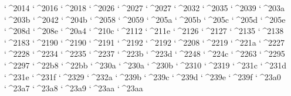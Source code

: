 \XeTeXcharclass `^^^^2014 \symbols
\XeTeXcharclass `^^^^2016 \symbols
\XeTeXcharclass `^^^^2018 \symbols
\XeTeXcharclass `^^^^2026 \symbols
\XeTeXcharclass `^^^^2027 \symbols
\XeTeXcharclass `^^^^2027 \symbols
\XeTeXcharclass `^^^^2032 \symbols
\XeTeXcharclass `^^^^2035 \symbols
\XeTeXcharclass `^^^^2039 \symbols
\XeTeXcharclass `^^^^203a \symbols
\XeTeXcharclass `^^^^203b \symbols
\XeTeXcharclass `^^^^2042 \symbols
\XeTeXcharclass `^^^^204b \symbols
\XeTeXcharclass `^^^^2058 \symbols
\XeTeXcharclass `^^^^2059 \symbols
\XeTeXcharclass `^^^^205a \symbols
\XeTeXcharclass `^^^^205b \symbols
\XeTeXcharclass `^^^^205c \symbols
\XeTeXcharclass `^^^^205d \symbols
\XeTeXcharclass `^^^^205e \symbols
\XeTeXcharclass `^^^^208d \symbols
\XeTeXcharclass `^^^^208e \symbols
\XeTeXcharclass `^^^^20a4 \symbols
\XeTeXcharclass `^^^^210c \symbols
\XeTeXcharclass `^^^^2112 \symbols
\XeTeXcharclass `^^^^211e \symbols
\XeTeXcharclass `^^^^2126 \symbols
\XeTeXcharclass `^^^^2127 \symbols
\XeTeXcharclass `^^^^2135 \symbols
\XeTeXcharclass `^^^^2138 \symbols
\XeTeXcharclass `^^^^2183 \symbols
\XeTeXcharclass `^^^^2190 \symbols
\XeTeXcharclass `^^^^2190 \symbols
\XeTeXcharclass `^^^^2191 \symbols
\XeTeXcharclass `^^^^2192 \symbols
\XeTeXcharclass `^^^^2192 \symbols
\XeTeXcharclass `^^^^2208 \symbols
\XeTeXcharclass `^^^^2219 \symbols
\XeTeXcharclass `^^^^221a \symbols
\XeTeXcharclass `^^^^2227 \symbols
\XeTeXcharclass `^^^^2228 \symbols
\XeTeXcharclass `^^^^2234 \symbols
\XeTeXcharclass `^^^^2235 \symbols
\XeTeXcharclass `^^^^2237 \symbols
\XeTeXcharclass `^^^^223b \symbols
\XeTeXcharclass `^^^^223d \symbols
\XeTeXcharclass `^^^^2248 \symbols
\XeTeXcharclass `^^^^224c \symbols
\XeTeXcharclass `^^^^2263 \symbols
\XeTeXcharclass `^^^^2295 \symbols
\XeTeXcharclass `^^^^2297 \symbols
\XeTeXcharclass `^^^^22b8 \symbols
\XeTeXcharclass `^^^^22bb \symbols
\XeTeXcharclass `^^^^230a \symbols
\XeTeXcharclass `^^^^230a \symbols
\XeTeXcharclass `^^^^230b \symbols
\XeTeXcharclass `^^^^2310 \symbols
\XeTeXcharclass `^^^^2319 \symbols
\XeTeXcharclass `^^^^231c \symbols
\XeTeXcharclass `^^^^231d \symbols
\XeTeXcharclass `^^^^231e \symbols
\XeTeXcharclass `^^^^231f \symbols
\XeTeXcharclass `^^^^2329 \symbols
\XeTeXcharclass `^^^^232a \symbols
\XeTeXcharclass `^^^^239b \symbols
\XeTeXcharclass `^^^^239c \symbols
\XeTeXcharclass `^^^^239d \symbols
\XeTeXcharclass `^^^^239e \symbols
\XeTeXcharclass `^^^^239f \symbols
\XeTeXcharclass `^^^^23a0 \symbols
\XeTeXcharclass `^^^^23a7 \symbols
\XeTeXcharclass `^^^^23a8 \symbols
\XeTeXcharclass `^^^^23a9 \symbols
\XeTeXcharclass `^^^^23aa \symbols
\XeTeXcharclass `^^^^23aa \symbols
